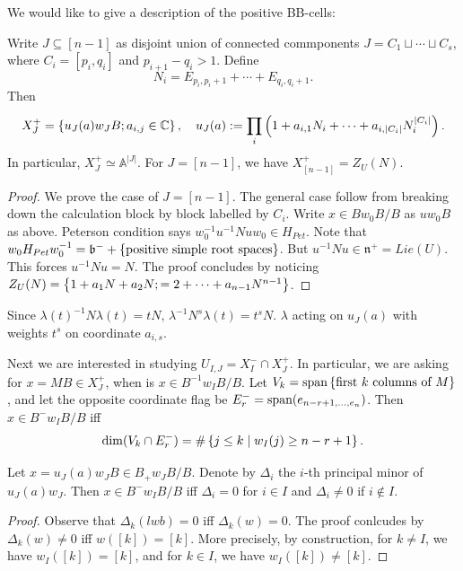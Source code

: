 We would like to give a description of the positive BB-cells:
\begin{lemma}{}
  Write $J\subseteq [n-1]$ as disjoint union of connected commponents $J=C_1\sqcup\cdots \sqcup C_s$, where $C_i=[p_i,q_i]$ and $p_{i+1}-q_i>1$. Define
  \[
    N_i=E_{p_i,p_i+1}+\cdots +E_{q_i,q_i+1}.
  \]
  Then
  \[
    X_J^+=\left\{u_J(a)w_JB; a_{i,j}\in \mathbb{C}\right\},\quad u_J(a):=\prod_{i}^{}\left(1+a_{i,1}N_{i}+\cdots +a_{i,|C_i|}N_{i}^{|C_i|}\right).
  \]
  In particular, $X^+_J\simeq \mathbb{A}^{|J|}$. For $J=[n-1]$, we have $X_{[n-1]}^+=Z_U(N)$.
  \begin{proof}
    We prove the case of $J=[n-1]$. The general case follow from breaking down the calculation block by block labelled by $C_i$. Write $x\in Bw_0B/B$ as $uw_0B$ as above. Peterson condition says $w_0^{-1}u^{-1}Nuw_0\in H_{Pet}$. Note that $w_0H_{Pet}w_0^{-1}=\mathfrak{b}^-+\left\{\textnormal{positive simple root spaces}\right\}$. But $u^{-1}Nu\in \mathfrak{n}^+=Lie(U)$. This forces $u^{-1}Nu=N$. The proof concludes by noticing $Z_U(N)=\left\{1+a_1N+a_2N;=2+\cdots +a_{n-1}N^{n-1}\right\}$.
  \end{proof}
\end{lemma}
\begin{remark}
  Since $\lambda(t)^{-1}N\lambda(t)=tN$, $\lambda^{-1}N^s\lambda(t)=t^sN$. $\lambda$ acting on $u_J(a)$ with weights $t^s$ on coordinate $a_{i,s}$.
\end{remark}

Next we are interested in studying $U_{I,J}=X_I^{-}\cap X_J^+$. In particular, we are asking for $x=MB\in X_J^+$, when is $x\in B^{-1}w_IB/B$. Let $V_k=\textnormal{span}\left\{\textnormal{first }k\textnormal{ columns of }M\right\}$, and let the opposite coordinate flag be $E_r^-=\textnormal{span}(e_{n-r+1,\dots ,e_n})$. Then $x\in B^-w_IB/B$ iff
\[
  \dim(V_k\cap E_r^-)=\#\left\{j\leq k\mid w_I(j)\geq n-r+1\right\}.
\]

\begin{lemma}[lem:]{}
  Let $x=u_J(a)w_JB\in B_+w_JB/B$. Denote by $\Delta_i$ the $i$-th principal minor of $u_J(a)w_J$. Then $x\in B^-w_IB/B$ iff $\Delta_i=0$ for $i\in I$ and $\Delta_i\neq 0$ if $i\notin I$.
  \begin{proof}
    Observe that $\Delta_k(lwb)=0$ iff $\Delta_k(w)=0$.
    The proof conlcudes by $\Delta_k(w)\neq 0$ iff $w([k])=[k]$. More precisely, by construction, for $k\neq I$, we have $w_I([k])=[k]$, and for $k\in I$, we have $w_I([k])\neq [k]$.
  \end{proof}
\end{lemma}

